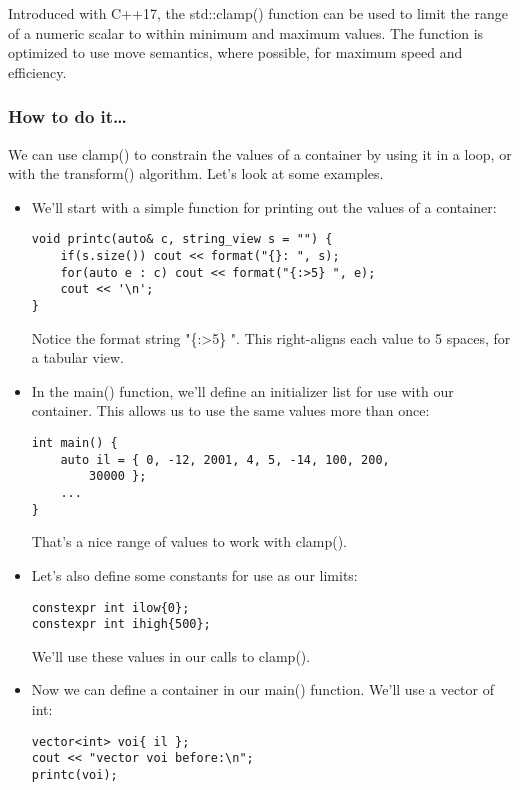 
Introduced with C++17, the std::clamp() function can be used to limit the range of a numeric scalar to within minimum and maximum values. The function is optimized to use move semantics, where possible, for maximum speed and efficiency.

\subsubsection{How to do it…}

We can use clamp() to constrain the values of a container by using it in a loop, or with the transform() algorithm. Let's look at some examples.

\begin{itemize}
\item 
We'll start with a simple function for printing out the values of a container:

\begin{lstlisting}[style=styleCXX]
void printc(auto& c, string_view s = "") {
	if(s.size()) cout << format("{}: ", s);
	for(auto e : c) cout << format("{:>5} ", e);
	cout << '\n';
}
\end{lstlisting}

Notice the format string "\{:>5\} ". This right-aligns each value to 5 spaces, for a tabular view.

\item 
In the main() function, we'll define an initializer list for use with our container.
This allows us to use the same values more than once:

\begin{lstlisting}[style=styleCXX]
int main() {
	auto il = { 0, -12, 2001, 4, 5, -14, 100, 200,
		30000 };
	...
}
\end{lstlisting}

That's a nice range of values to work with clamp().

\item 
Let's also define some constants for use as our limits:

\begin{lstlisting}[style=styleCXX]
constexpr int ilow{0};
constexpr int ihigh{500};
\end{lstlisting}

We'll use these values in our calls to clamp().

\item 
Now we can define a container in our main() function. We'll use a vector of int:

\begin{lstlisting}[style=styleCXX]
vector<int> voi{ il };
cout << "vector voi before:\n";
printc(voi);
\end{lstlisting}


\end{itemize}
